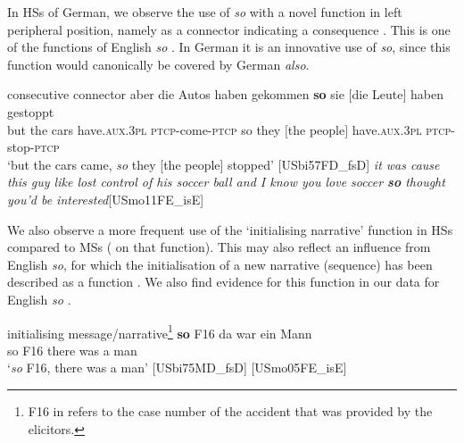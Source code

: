 \documentclass[output=paper,colorlinks,citecolor=brown]{langscibook}
\begin{document}
In HSs of German, we observe the use of \textit{so} with a novel function in left peripheral position, namely as a connector indicating a consequence . This is one of the functions of English \textit{so} . In German it is an innovative use of \textit{so}, since this function would canonically be covered by German \textit{also}.

\pagebreak
\ea consecutive connector \label{ex:labrenzetal:11}
    \ea\label{ex:labrenzetal:11a}
\gll aber die Autos haben gekommen \textbf{so} sie $[$die Leute$]$ haben gestoppt\\
but the cars have.\textsc{aux.3pl} \textsc{ptcp}-come-\textsc{ptcp} so they $[$the people$]$ have.\textsc{aux.3pl} \textsc{ptcp}-stop-\textsc{ptcp}\\
\glt ‘but the cars came, \textit{so} they [the people] stopped’ \hfill[USbi57FD\_fsD]
  \ex \textit{it was cause this guy like lost control of his soccer ball and I know you love soccer \textbf{so} thought you’d be interested}\label{ex:labrenzetal:11b}\hfill[USmo11FE\_isE]
  \z
\z

\noindent We also observe a more frequent use of the ‘initialising narrative’ function in HSs compared to MSs (\citealt[cf.][]{hennig_grammatik_2006} on that function). This may also reflect an influence from English \textit{so}, for which the initialisation of a new narrative (sequence) has been described as a function \citep[cf.][]{bolden_implementing_2009}. We also find evidence for this function in our data for English \textit{so} .

\ea initialising message/narrative\footnote{F16 in  refers to the case number of the accident that was provided by the elicitors.} \label{ex:labrenzetal:12}
  \ea\label{ex:labrenzetal:12a}
\gll \textbf{so} F16 da war ein Mann\\ so F16 there was a man\\
\glt ‘\textit{so} F16, there was a man’ \hfill[USbi75MD\_fsD]
   \label{ex:labrenzetal:12b}\hfill[USmo05FE\_isE]
  \z
\z
\end{document}
